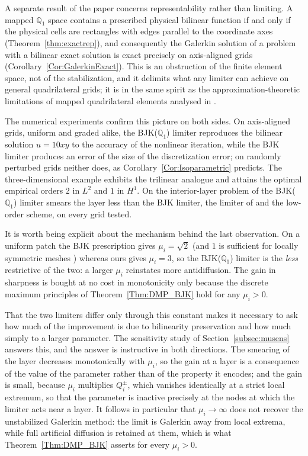 \documentclass[a4paper]{article}
\theoremstyle{plain}
\theoremstyle{definition}
\theoremstyle{remark}
\begin{document}
A separate result of the paper concerns representability rather than limiting. A mapped
$\mathbb{Q}_1$ space contains a prescribed physical bilinear function if and only if the
physical cells are rectangles with edges parallel to the coordinate axes
(Theorem~\ref{thm:exactrep}), and consequently the Galerkin solution of a problem with a
bilinear exact solution is exact precisely on axis-aligned grids
(Corollary~\ref{Cor:GalerkinExact}). This is an obstruction of the finite element
space, not of the stabilization, and it delimits what any limiter can achieve on
general quadrilateral grids; it is in the same spirit as the approximation-theoretic
limitations of mapped quadrilateral elements analysed in
\cite{ABF02}.

The numerical experiments confirm this picture on both sides. On axis-aligned grids,
uniform and graded alike, the BJK($\mathbb{Q}_1$) limiter reproduces the bilinear solution $u = 10xy$ to
the accuracy of the nonlinear iteration, while the BJK limiter produces an error of the
size of the discretization error; on randomly perturbed grids neither does, as
Corollary~\ref{Cor:Isoparametric} predicts. The three-dimensional example exhibits the
trilinear analogue and attains the optimal empirical orders $2$ in $L^2$ and $1$ in
$H^1$. On the interior-layer problem of
\cite{HMM86} the BJK($\mathbb{Q}_1$) limiter smears the layer less than the BJK limiter, the
limiter of \cite{Ku09} and the low-order scheme, on every grid tested.

It is worth being explicit about the mechanism behind the last observation. On a
uniform patch the BJK prescription gives $\mu_i = \sqrt{2}$ (and $1$ is sufficient
for locally symmetric meshes \cite{BJK17}) whereas ours gives $\mu_i = 3$, so the
BJK($\mathbb{Q}_1$) limiter is the \emph{less} restrictive of the two: a larger
$\mu_i$ reinstates more antidiffusion. The gain in sharpness is bought at no cost in
monotonicity only because the discrete maximum principles of
Theorem~\ref{Thm:DMP_BJK} hold for any $\mu_i > 0$.

That the two limiters differ only through this constant makes it necessary to ask
how much of the improvement is due to bilinearity preservation and how much simply
to a larger parameter. The sensitivity study of Section~\ref{subsec:musens} answers
this, and the answer is instructive in both directions. The smearing of the layer
decreases monotonically with $\mu_i$, so the gain at a layer is a consequence of the
value of the parameter rather than of the property it encodes; and the gain is
small, because $\mu_i$ multiplies $Q_i^{\pm}$, which vanishes identically at a
strict local extremum, so that the parameter is inactive precisely at the nodes at
which the limiter acts near a layer. It follows in particular that
$\mu_i \to \infty$ does not recover the unstabilized Galerkin method: the limit is
Galerkin away from local extrema, while full artificial diffusion is retained at
them, which is what Theorem~\ref{Thm:DMP_BJK} asserts for every $\mu_i > 0$.
\end{document}
